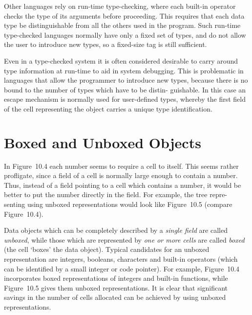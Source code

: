 Other languages rely on run-time type-checking, where each built-in
operator checks the type of its arguments before proceeding. This requires
that each data type be distinguishable from all the others used in the program.
Such run-time type-checked languages normally have only a fixed set of types,
and do not allow the user to introduce new types, so a fixed-size tag is still
sufficient.

Even in a type-checked system it is often considered desirable to carry
around type information at run-time to aid in system debugging. This is
problematic in languages that allow the programmer to introduce new types,
because there is no bound to the number of types which have to be distin-
guishable. In this case an escape mechanism is normally used for user-defined
types, whereby the first field of the cell representing the object carries a
unique type identification.

\section{Boxed and Unboxed Objects}

In Figure~10.4 each number seems to require a cell to itself. This seems rather
profligate, since a field of a cell is normally large enough to contain a number.
Thus, instead of a field pointing to a cell which contains a number, it would be
better to put the number directly in the field. For example, the tree repre-
senting  using unboxed representations would look like Figure~10.5
(compare Figure~10.4).

Data objects which can be completely described by a \textit{single field} are called
\textit{unboxed}, while those which are represented by \textit{one or more cells} are called
\textit{boxed} (the cell `boxes' the data object). Typical candidates for an unboxed
representation are integers, booleans, characters and built-in operators
(which can be identified by a small integer or code pointer). For example,
Figure~10.4 incorporates boxed representations of integers and built-in
functions, while Figure~10.5 gives them unboxed representations. It is clear
that significant savings in the number of cells allocated can be achieved by
using unboxed representations.

